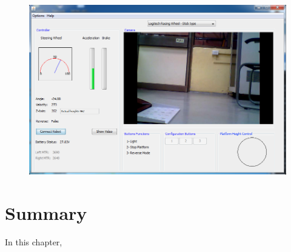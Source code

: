 \begin{figure}
	\includegraphics[width=\linewidth,keepaspectratio]{Chapter5/fig/gui}
	\label{fig:Gui} 
\end{figure}



\section{Summary}
In this chapter, 